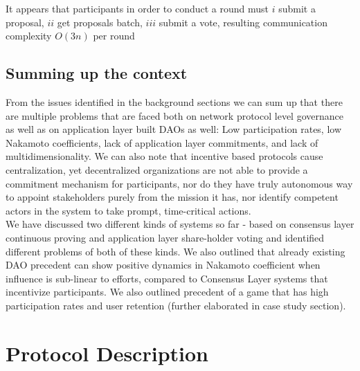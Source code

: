 \documentclass{article}
\begin{document}
\begin{CJK}{UTF8}{gbsn}
\begin{multicols}{2}
        It appears that participants in order to conduct a round must \(i\) submit a proposal, \(ii\) get proposals batch, \(iii\) submit a vote, resulting communication complexity $O(3n)$ per round


        \subsection{Summing up the context}
        From the issues identified in the background sections we can sum up that there are multiple problems that are faced both on network protocol level governance as well as on application layer built DAOs as well: Low participation rates, low Nakamoto coefficients, lack of application layer commitments, and lack of multidimensionality.
        We can also note that incentive based protocols cause centralization, yet decentralized organizations are not able to provide a commitment mechanism for participants, nor do they have truly autonomous way to appoint stakeholders purely from the mission it has, nor identify competent actors in the system to take prompt, time-critical actions.\\
        We have discussed two different kinds of systems so far - based on consensus layer continuous proving and application layer share-holder voting and identified different problems of both of these kinds.
        We also outlined that already existing DAO precedent can show positive dynamics in Nakamoto coefficient when influence is sub-linear to efforts, compared to Consensus Layer systems that incentivize participants. We also outlined precedent of a game that has high participation rates and user retention (further elaborated in case study section).\\

        \section{Protocol Description}


\end{multicols}
\end{CJK}
\end{document}
